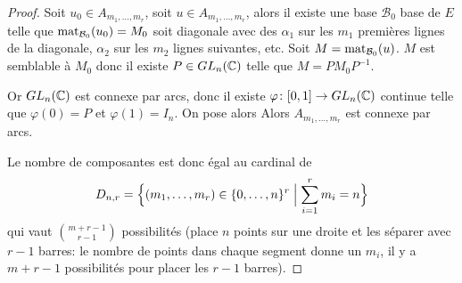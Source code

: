\begin{proof}
	Soit $u_{0}\in A_{m_{1},\dots,m_{r}}$, soit $u\in A_{m_{1},\dots,m_{r}}$, alors il existe une base $\mathcal{B}_{0}$ base de $E$ telle que $\operatorname{mat}\limits_{\mathcal{B}_{0}}(u_{0})=M_{0}$ soit diagonale avec des $\alpha_{1}$ sur les $m_{1}$ premières lignes de la diagonale, $\alpha_{2}$ sur les $m_{2}$ lignes suivantes, etc. Soit $M=\operatorname{mat}\limits_{\mathcal{B}_{0}}(u)$. $M$ est semblable à $M_{0}$ donc il existe $P\in GL_{n}(\mathbb{C})$ telle que $M=PM_{0}P^{-1}$.

	Or $GL_{n}(\mathbb{C})$ est connexe par arcs, donc il existe $\varphi\colon[0,1]\to GL_{n}(\mathbb{C})$ continue telle que $\varphi(0)=P$ et $\varphi(1)=I_{n}$. On pose alors 
	Alors $A_{m_{1},\dots,m_{r}}$ est connexe par arcs.

	Le nombre de composantes est donc égal au cardinal de 
	\begin{equation}D_{n,r}=\Bigl\{(m_{1},\dots,m_{r})\in\{0,\dots,n\}^{r}\Bigm|\sum_{i=1}^{r}m_{i}=n\Bigr\}\end{equation}
	qui vaut $\binom{m+r-1}{r-1}$ possibilités (place $n$ points sur une droite et les séparer avec $r-1$ barres: le nombre de points dans chaque segment donne un $m_{i}$, il y a $m+r-1$ possibilités pour placer les $r-1$ barres).
\end{proof}

